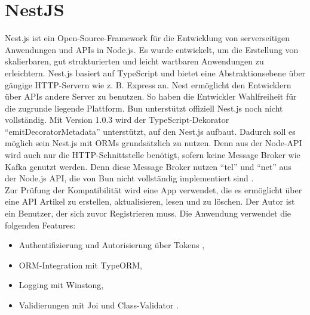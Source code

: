 \section{NestJS} \label{sec:compabitility-existingProjects}
Nest.js ist ein Open-Source-Framework für die Entwicklung von serverseitigen Anwendungen und APIs in Node.js. Es wurde entwickelt, um die Erstellung von skalierbaren, gut strukturierten und leicht wartbaren Anwendungen zu erleichtern. Nest.js basiert auf TypeScript und bietet eine Abstraktionsebene über gängige HTTP-Servern wie z. B. Express an. Nest ermöglicht den Entwicklern über APIs andere Server zu benutzen. So haben die Entwickler Wahlfreiheit für die zugrunde liegende Plattform.  Bun unterstützt offiziell Nest.js noch nicht vollständig.  Mit Version 1.0.3 wird der TypeScript-Dekorator ``emitDecoratorMetadata'' unterstützt, auf den Nest.js aufbaut.  Dadurch soll es möglich sein Nest.js mit ORMs  grundsätzlich zu nutzen. Denn aus der Node-API wird auch nur die HTTP-Schnittstelle benötigt, sofern keine Message Broker wie Kafka genutzt werden. Denn diese Message Broker nutzen ``tel'' und ``net'' aus der Node.js API, die von Bun nicht vollständig implementiert sind .\\

\noindent
Zur Prüfung der Kompatibilität wird eine App verwendet, die es ermöglicht über eine API Artikel zu erstellen, aktualisieren, lesen und zu löschen. Der Autor ist ein Benutzer, der sich zuvor Registrieren muss. Die Anwendung verwendet die folgenden Features:

\begin{itemize}
	\item Authentifizierung und Autorisierung über Tokens ,
	\item ORM-Integration mit TypeORM,
	\item Logging mit Winstong,
	\item Validierungen mit Joi und Class-Validator .
\end{itemize}

